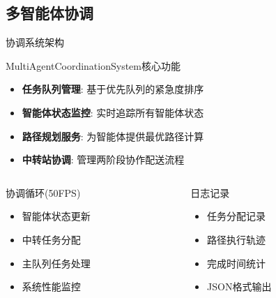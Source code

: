 \documentclass[
10pt,
aspectratio=169,
]{beamer}
\begin{document}
\subsection{多智能体协调}

\begin{frame}{协调系统架构}
    \begin{block}{MultiAgentCoordinationSystem核心功能}
        \begin{itemize}
            \item \textbf{任务队列管理}: 基于优先队列的紧急度排序
            \item \textbf{智能体状态监控}: 实时追踪所有智能体状态
            \item \textbf{路径规划服务}: 为智能体提供最优路径计算
            \item \textbf{中转站协调}: 管理两阶段协作配送流程
        \end{itemize}
    \end{block}
    
    \begin{columns}
        \begin{column}{0.5\textwidth}
            \begin{alertblock}{协调循环(50FPS)}
                \begin{itemize}
                    \item 智能体状态更新
                    \item 中转任务分配
                    \item 主队列任务处理
                    \item 系统性能监控
                \end{itemize}
            \end{alertblock}
        \end{column}
        \begin{column}{0.5\textwidth}
            \begin{exampleblock}{日志记录}
                \begin{itemize}
                    \item 任务分配记录
                    \item 路径执行轨迹
                    \item 完成时间统计
                    \item JSON格式输出
                \end{itemize}
            \end{exampleblock}
        \end{column}
    \end{columns}
\end{frame}
\end{document}
